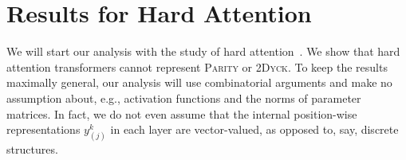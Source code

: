 \documentclass[11pt,a4paper]{article}
\begin{document}















\section{Results for Hard Attention}\label{sec:hard}

We will start our analysis with the study of hard attention~\cite{perez2019turing}.
We show that hard attention transformers cannot represent \textsc{Parity} or \textsc{2Dyck}. %
To keep the results maximally general, our analysis will use combinatorial arguments and make no assumption about, e.g., activation functions and the norms of parameter matrices.
In fact, we do not even assume that the internal position-wise representations $y_{(j)}^k$ in each layer are vector-valued, as opposed to, say, discrete structures.
\end{document}
